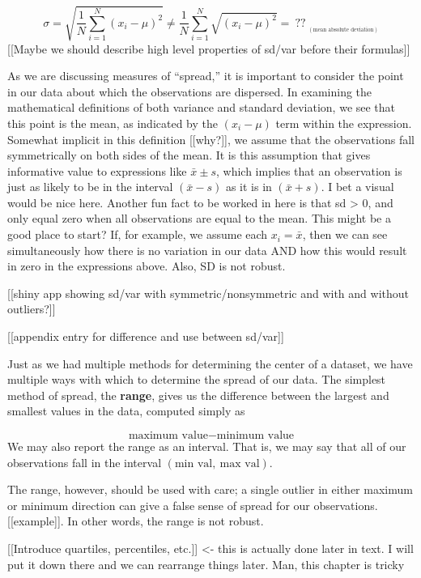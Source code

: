 \documentclass[
]{book}
\theoremstyle{definition}
\theoremstyle{definition}
\theoremstyle{definition}
\theoremstyle{remark}
\begin{document}
\[
\sigma = \sqrt{\frac{1}{N} \sum_{i=1}^N (x_i - \mu)^2} \not= \frac{1}{N} \sum_{i=1}^N \sqrt{(x_i - \mu)^2} = \ ?? \ _{_{(\text{mean absolute deviation})}}
\]
{[}{[}Maybe we should describe high level properties of sd/var before their formulas{]}{]}

As we are discussing measures of ``spread,'' it is important to consider the point in our data about which the observations are dispersed. In examining the mathematical definitions of both variance and standard deviation, we see that this point is the mean, as indicated by the \((x_i - \mu)\) term within the expression. Somewhat implicit in this definition {[}{[}why?{]}{]}, we assume that the observations fall symmetrically on both sides of the mean. It is this assumption that gives informative value to expressions like \(\bar{x} \pm s\), which implies that an observation is just as likely to be in the interval \((\bar{x} - s)\) as it is in \((\bar{x}+ s)\). I bet a visual would be nice here. Another fun fact to be worked in here is that sd \textgreater{} 0, and only equal zero when all observations are equal to the mean. This might be a good place to start? If, for example, we assume each \(x_i = \bar{x}\), then we can see simultaneously how there is no variation in our data AND how this would result in zero in the expressions above. Also, SD is not robust.

{[}{[}shiny app showing sd/var with symmetric/nonsymmetric and with and without outliers?{]}{]}

{[}{[}appendix entry for difference and use between sd/var{]}{]}

Just as we had multiple methods for determining the center of a dataset, we have multiple ways with which to determine the spread of our data. The simplest method of spread, the \textbf{range}, gives us the difference between the largest and smallest values in the data, computed simply as

\[
\text{maximum value} - \text{minimum value}
\]
We may also report the range as an interval. That is, we may say that all of our observations fall in the interval \((\text{min val}, \ \text{max val})\).

The range, however, should be used with care; a single outlier in either maximum or minimum direction can give a false sense of spread for our observations. {[}{[}example{]}{]}. In other words, the range is not robust.

{[}{[}Introduce quartiles, percentiles, etc.{]}{]} \textless- this is actually done later in text. I will put it down there and we can rearrange things later. Man, this chapter is tricky
\end{document}
